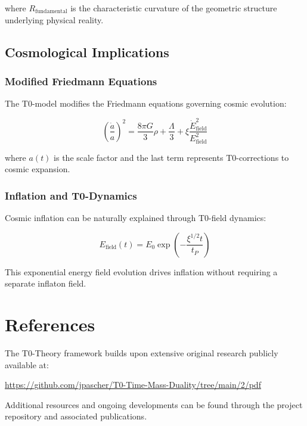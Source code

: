 \documentclass[12pt,a4paper]{article}
\theoremstyle{definition}
\begin{document}
	where $R_{\text{fundamental}}$ is the characteristic curvature of the geometric structure underlying physical reality.
	
	\subsection{Cosmological Implications}
	
	\subsubsection{Modified Friedmann Equations}
	
	The T0-model modifies the Friedmann equations governing cosmic evolution:
	
	\begin{equation}
		\left(\frac{\dot{a}}{a}\right)^2 = \frac{8\pi G}{3}\rho + \frac{\Lambda}{3} + \xi \frac{\dot{E}_{\text{field}}^2}{E_{\text{field}}^2}
	\end{equation}
	
	where $a(t)$ is the scale factor and the last term represents T0-corrections to cosmic expansion.
	
	\subsubsection{Inflation and T0-Dynamics}
	
	Cosmic inflation can be naturally explained through T0-field dynamics:
	
	\begin{equation}
		E_{\text{field}}(t) = E_0 \exp\left(-\frac{\xi^{1/2} t}{t_P}\right)
	\end{equation}
	
	This exponential energy field evolution drives inflation without requiring a separate inflaton field.
	
	

	\section{References}
	
	The T0-Theory framework builds upon extensive original research publicly available at:
	
	\begin{center}
		\url{https://github.com/jpascher/T0-Time-Mass-Duality/tree/main/2/pdf}
	\end{center}
	
	Additional resources and ongoing developments can be found through the project repository and associated publications.
	
\end{document}
